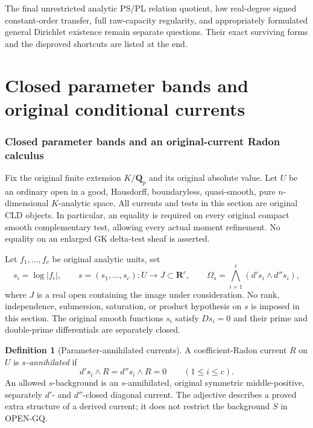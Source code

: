 \documentclass[11pt,a4paper]{article}
\numberwithin{equation}{section}
\theoremstyle{definition}
\newtheorem{definition}[theorem]{Definition}
\theoremstyle{remark}
\begin{document}
The final unrestricted analytic PS/PL relation quotient, low
real-degree signed constant-order transfer, full raw-capacity
regularity, and appropriately formulated general Dirichlet
existence remain separate questions. Their exact surviving
forms and the disproved shortcuts are listed at the end.




\part{Closed parameter bands and original conditional currents}

\section{Closed parameter bands and an original-current Radon calculus}
\label{sec:r12-closed-parameter-bands}

Fix the original finite extension $K/\mathbf Q_p$ and its original
absolute value. Let $U$ be an ordinary open in a good, Hausdorff,
boundaryless, quasi-smooth, pure $n$-dimensional $K$-analytic space.
All currents and tests in this section are original CLD objects.
In particular, an equality is required on every original compact
smooth complementary test, allowing every actual moment refinement.
No equality on an enlarged GK delta-test sheaf is asserted.

Let $f_1,\ldots,f_c$ be original analytic units, set
\[
 s_i=\log|f_i|,\qquad s=(s_1,\ldots,s_c):U\longrightarrow J\subset\mathbf R^c,
 \qquad
 \Omega_s=\bigwedge_{i=1}^c(d's_i\wedge d''s_i),
 \tag{PB1}
\]
where $J$ is a real open containing the image under consideration.
No rank, independence, submersion, saturation, or product hypothesis
on $s$ is imposed in this section. The original smooth functions
$s_i$ satisfy $Ds_i=0$ and their prime and double-prime differentials
are separately closed.

\begin{definition}[Parameter-annihilated currents]
\label{def:r12-parameter-annihilated}
A coefficient-Radon current $R$ on $U$ is \emph{$s$-annihilated} if
\[
                 d's_i\wedge R=d''s_i\wedge R=0
                         \qquad(1\le i\le c).
 \tag{PB2}
\]
An allowed $s$-background is an $s$-annihilated, original symmetric
middle-positive, separately $d'$- and $d''$-closed diagonal current.
The adjective describes a proved extra structure of a derived
current; it does not restrict the background $S$ in OPEN-GQ.
\end{definition}
\end{document}
